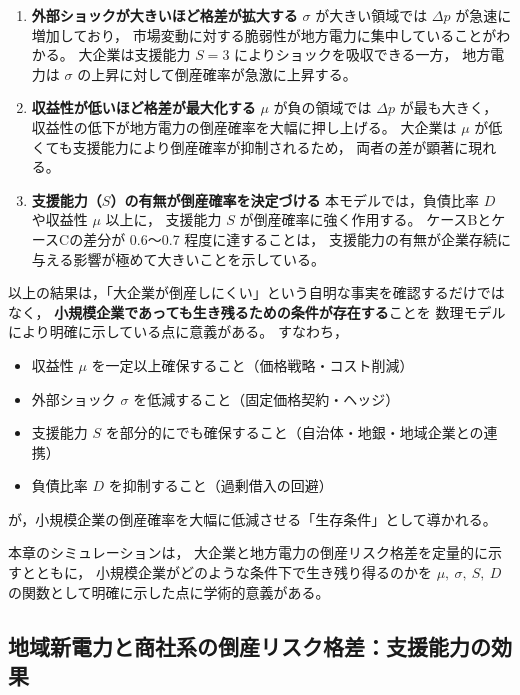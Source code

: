 \begin{enumerate}
    \item \textbf{外部ショックが大きいほど格差が拡大する}  
    $\sigma$ が大きい領域では $\Delta p$ が急速に増加しており，
    市場変動に対する脆弱性が地方電力に集中していることがわかる。
    大企業は支援能力 $S=3$ によりショックを吸収できる一方，
    地方電力は $\sigma$ の上昇に対して倒産確率が急激に上昇する。

    \item \textbf{収益性が低いほど格差が最大化する}  
    $\mu$ が負の領域では $\Delta p$ が最も大きく，
    収益性の低下が地方電力の倒産確率を大幅に押し上げる。
    大企業は $\mu$ が低くても支援能力により倒産確率が抑制されるため，
    両者の差が顕著に現れる。

    \item \textbf{支援能力（$S$）の有無が倒産確率を決定づける}  
    本モデルでは，負債比率 $D$ や収益性 $\mu$ 以上に，
    支援能力 $S$ が倒産確率に強く作用する。
    ケースBとケースCの差分が 0.6〜0.7 程度に達することは，
    支援能力の有無が企業存続に与える影響が極めて大きいことを示している。
\end{enumerate}

以上の結果は，「大企業が倒産しにくい」という自明な事実を確認するだけではなく，
\textbf{小規模企業であっても生き残るための条件が存在する}ことを
数理モデルにより明確に示している点に意義がある。
すなわち，

\begin{itemize}
    \item 収益性 $\mu$ を一定以上確保すること（価格戦略・コスト削減）
    \item 外部ショック $\sigma$ を低減すること（固定価格契約・ヘッジ）
    \item 支援能力 $S$ を部分的にでも確保すること（自治体・地銀・地域企業との連携）
    \item 負債比率 $D$ を抑制すること（過剰借入の回避）
\end{itemize}

が，小規模企業の倒産確率を大幅に低減させる「生存条件」として導かれる。

本章のシミュレーションは，
大企業と地方電力の倒産リスク格差を定量的に示すとともに，
小規模企業がどのような条件下で生き残り得るのかを
$\mu,\ \sigma,\ S,\ D$ の関数として明確に示した点に学術的意義がある。


\subsection*{地域新電力と商社系の倒産リスク格差：支援能力の効果}


